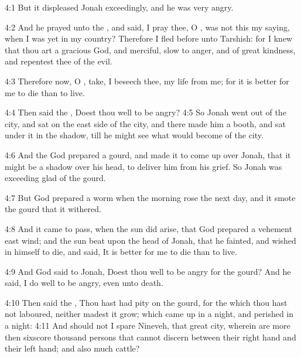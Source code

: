 4:1 But it displeased Jonah exceedingly, and he was very angry.

4:2 And he prayed unto the \LORD, and said, I pray thee, O \LORD, was
not this my saying, when I was yet in my country? Therefore I fled
before unto Tarshish: for I knew that thou art a gracious God, and
merciful, slow to anger, and of great kindness, and repentest thee of
the evil.

4:3 Therefore now, O \LORD, take, I beseech thee, my life from me; for
it is better for me to die than to live.

4:4 Then said the \LORD, Doest thou well to be angry?  4:5 So Jonah
went out of the city, and sat on the east side of the city, and there
made him a booth, and sat under it in the shadow, till he might see
what would become of the city.

4:6 And the \LORD God prepared a gourd, and made it to come up over
Jonah, that it might be a shadow over his head, to deliver him from
his grief. So Jonah was exceeding glad of the gourd.

4:7 But God prepared a worm when the morning rose the next day, and it
smote the gourd that it withered.

4:8 And it came to pass, when the sun did arise, that God prepared a
vehement east wind; and the sun beat upon the head of Jonah, that he
fainted, and wished in himself to die, and said, It is better for me
to die than to live.

4:9 And God said to Jonah, Doest thou well to be angry for the gourd?
And he said, I do well to be angry, even unto death.

4:10 Then said the \LORD, Thou hast had pity on the gourd, for the
which thou hast not laboured, neither madest it grow; which came up in
a night, and perished in a night: 4:11 And should not I spare Nineveh,
that great city, wherein are more then sixscore thousand persons that
cannot discern between their right hand and their left hand; and also
much cattle?

